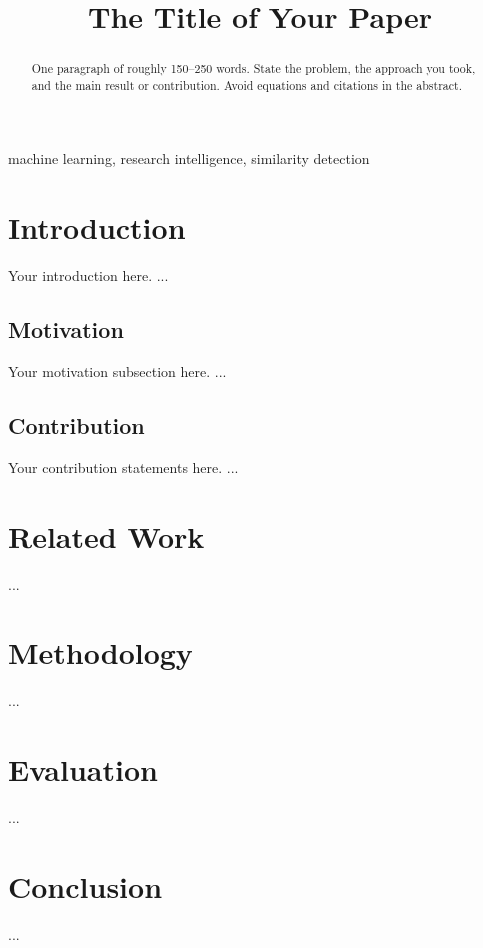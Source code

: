 \documentclass[conference]{IEEEtran}
\begin{document}
\title{The Title of Your Paper}

\author{
\and
{}
}

\maketitle

\begin{abstract}
One paragraph of roughly 150--250 words. State the problem, the approach you
took, and the main result or contribution. Avoid equations and citations in
the abstract.
\end{abstract}

\begin{IEEEkeywords}
machine learning, research intelligence, similarity detection
\end{IEEEkeywords}

\section{Introduction}
Your introduction here. ...

\subsection{Motivation}
Your motivation subsection here. ...

\subsection{Contribution}
Your contribution statements here. ...

\section{Related Work}
...

\section{Methodology}
...

\section{Evaluation}
...

\section{Conclusion}
...



\end{document}
